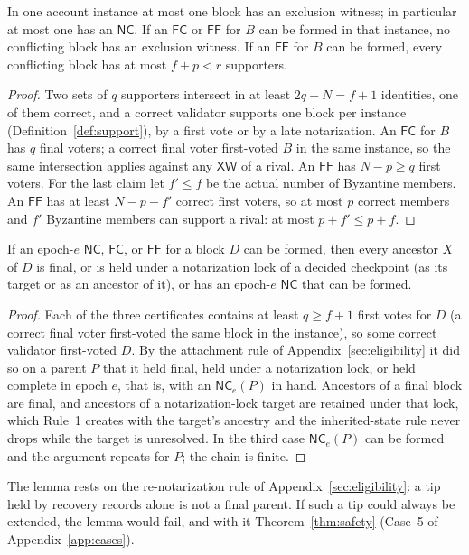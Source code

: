 \documentclass[conference]{IEEEtran}
\newcommand{\NC}{\mathsf{NC}}
\newcommand{\XW}{\mathsf{XW}}
\newcommand{\FC}{\mathsf{FC}}
\newcommand{\FF}{\mathsf{FF}}
\begin{document}
\begin{lemma}
\label{lem:exclusion}
In one account instance at most one block has an exclusion witness; in particular at most one has an $\NC$. If an $\FC$ or $\FF$ for $B$ can be formed in that instance, no conflicting block has an exclusion witness. If an $\FF$ for $B$ can be formed, every conflicting block has at most $f+p<r$ supporters.
\end{lemma}
\begin{proof}
Two sets of $q$ supporters intersect in at least $2q-N=f+1$ identities, one of them correct, and a correct validator supports one block per instance (Definition~\ref{def:support}), by a first vote or by a late notarization. An $\FC$ for $B$ has $q$ final voters; a correct final voter first-voted $B$ in the same instance, so the same intersection applies against any $\XW$ of a rival. An $\FF$ has $N-p\ge q$ first voters. For the last claim let $f'\le f$ be the actual number of Byzantine members. An $\FF$ has at least $N-p-f'$ correct first voters, so at most $p$ correct members and $f'$ Byzantine members can support a rival: at most $p+f'\le p+f$.
\end{proof}

\begin{lemma}
\label{lem:ancestry}
If an epoch-$e$ $\NC$, $\FC$, or $\FF$ for a block $D$ can be formed, then every ancestor $X$ of $D$ is final, or is held under a notarization lock of a decided checkpoint (as its target or as an ancestor of it), or has an epoch-$e$ $\NC$ that can be formed.
\end{lemma}
\begin{proof}
Each of the three certificates contains at least $q\ge f+1$ first votes for $D$ (a correct final voter first-voted the same block in the instance), so some correct validator first-voted $D$. By the attachment rule of Appendix~\ref{sec:eligibility} it did so on a parent $P$ that it held final, held under a notarization lock, or held complete in epoch $e$, that is, with an $\NC_e(P)$ in hand. Ancestors of a final block are final, and ancestors of a notarization-lock target are retained under that lock, which Rule~1 creates with the target's ancestry and the inherited-state rule never drops while the target is unresolved. In the third case $\NC_e(P)$ can be formed and the argument repeats for $P$; the chain is finite.
\end{proof}
The lemma rests on the re-notarization rule of Appendix~\ref{sec:eligibility}: a tip held by recovery records alone is not a final parent. If such a tip could always be extended, the lemma would fail, and with it Theorem~\ref{thm:safety} (Case~5 of Appendix~\ref{app:cases}).
\end{document}
